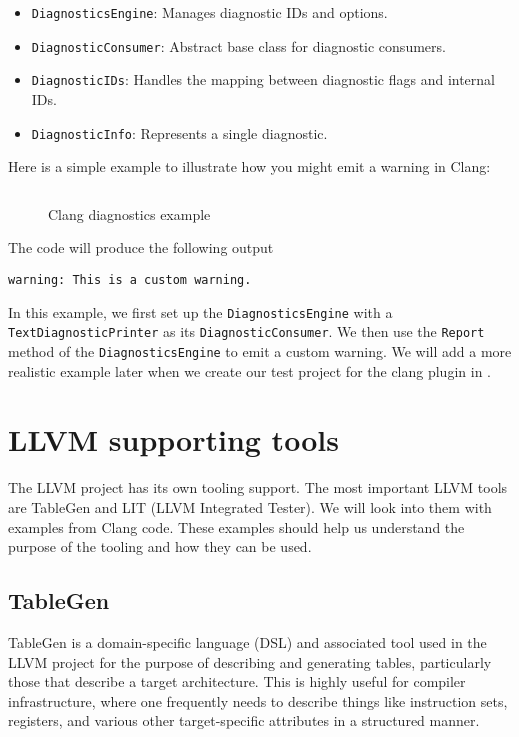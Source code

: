 \begin{itemize}
  \item \texttt{DiagnosticsEngine}: Manages diagnostic IDs and options.
  \item \texttt{DiagnosticConsumer}: Abstract base class for diagnostic consumers.
  \item \texttt{DiagnosticIDs}: Handles the mapping between diagnostic flags and internal IDs.
  \item \texttt{DiagnosticInfo}: Represents a single diagnostic.
\end{itemize}

Here is a simple example to illustrate how you might emit a warning in Clang:
\begin{figure}[H]
\inputminted[firstline=5,lastline=27]{c++}{src/part1/ch4_baselibs/diag/Diags.cpp}
\caption{Clang diagnostics example}
\label{lis:ch4:diag_example}
\end{figure}
The code will produce the following output
\begin{adjustwidth}{0em}{0em}
\begin{verbatim}
warning: This is a custom warning.
\end{verbatim}
\end{adjustwidth}

In this example, we first set up the \texttt{DiagnosticsEngine} with a
\texttt{TextDiagnosticPrinter} as its
\texttt{DiagnosticConsumer}. We then use the \texttt{Report}
method of the \texttt{DiagnosticsEngine} to emit a custom warning. We
will add a more realistic example later when we create our test project for the
clang plugin in . 

\section{LLVM supporting tools}
The LLVM project has its own tooling support. The most important LLVM tools are
TableGen and LIT (LLVM Integrated Tester). We will look into them with examples
from Clang code. These examples should help us understand the purpose of the
tooling and how they can be used. 

\subsection{TableGen}
TableGen is a domain-specific language (DSL) and associated tool used in the LLVM
project for the purpose of describing and generating tables, particularly those
that describe a target architecture. This is highly useful for compiler
infrastructure, where one frequently needs to describe things like instruction
sets, registers, and various other target-specific attributes in a structured
manner.

